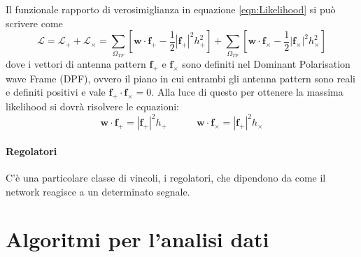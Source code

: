 Il funzionale rapporto di verosimiglianza in equazione \ref{eqn:Likelihood} si può scrivere come
\begin{equation}
	\mathcal{L} = \mathcal{L}_+ + \mathcal{L}_\times = \sum_{\Omega_{TF}}\left[ \textbf{w} \cdot \textbf{f}_+ - \frac{1}{2}|\textbf{f}_+|^2h_+^2\right] + \sum_{\Omega_{TF}}\left[ \textbf{w} \cdot \textbf{f}_\times - \frac{1}{2}|\textbf{f}_\times|^2h_\times^2\right]
	\label{eqn:label_separated}
\end{equation}
dove i vettori di antenna pattern $\textbf{f}_+$ e $\textbf{f}_\times$ sono definiti nel Dominant Polarisation wave Frame (DPF), ovvero il piano in cui entrambi gli antenna pattern sono reali e definiti positivi e vale $\textbf{f}_+ \cdot \textbf{f}_\times = 0$. Alla luce di questo per ottenere la massima likelihood si dovrà risolvere le equazioni:
\begin{equation}
	\textbf{w} \cdot \textbf{f}_+ = |\textbf{f}_+|^2h_+ \quad\quad\quad  \textbf{w} \cdot \textbf{f}_\times = |\textbf{f}_+|^2h_\times 
	\label{eqn:sistema_soluzione}
\end{equation}
\paragraph{Regolatori} C'è una particolare classe di vincoli, i regolatori, che dipendono da come il network reagisce a un determinato segnale\cite{Klimenko_2008}.
\section{Algoritmi per l'analisi dati}
